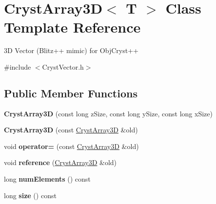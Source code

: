 \hypertarget{class_cryst_array3_d}{}\section{Cryst\+Array3D$<$ T $>$ Class Template Reference}
\label{class_cryst_array3_d}


3D Vector (Blitz++ mimic) for Obj\+Cryst++  




{\ttfamily \#include $<$Cryst\+Vector.\+h$>$}

\subsection*{Public Member Functions}
\begin{DoxyCompactItemize}
\item 
\mbox{\label{class_cryst_array3_d_ad4ec05dc1208057b2ecabd8e8f2289f2}} 
{\bfseries Cryst\+Array3D} (const long z\+Size, const long y\+Size, const long x\+Size)
\item 
\mbox{\label{class_cryst_array3_d_a7dabbca0551384e792bf898522073015}} 
{\bfseries Cryst\+Array3D} (const \mbox{\hyperlink{class_cryst_array3_d}{Cryst\+Array3D}} \&old)
\item 
\mbox{\label{class_cryst_array3_d_aafcbba0c2e2e64710f25d4706a18aff1}} 
void {\bfseries operator=} (const \mbox{\hyperlink{class_cryst_array3_d}{Cryst\+Array3D}} \&old)
\item 
\mbox{\label{class_cryst_array3_d_ac9c03573514355402c5da9c9bcb593aa}} 
void {\bfseries reference} (\mbox{\hyperlink{class_cryst_array3_d}{Cryst\+Array3D}} \&old)
\item 
\mbox{\label{class_cryst_array3_d_a382706adbd901439600a9821e2838daa}} 
long {\bfseries num\+Elements} () const
\item 
\mbox{\label{class_cryst_array3_d_a1f733f6e036d4d6c39eb5ef042ff2741}} 
long {\bfseries size} () const
\item 
\mbox{\label{class_cryst_array3_d_aefd38cdcd3835f1bb4f8c82dd907ca37}} 

\end{DoxyCompactItemize}
